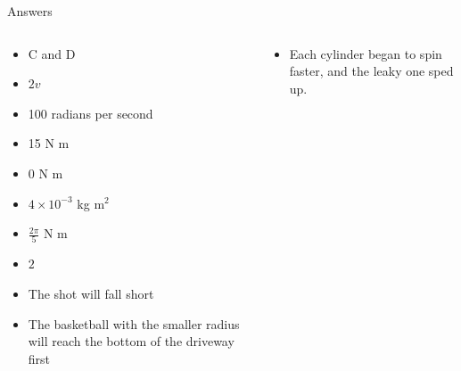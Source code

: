 \documentclass{beamer}
\begin{document}
\begin{frame}{Answers}
\small
\begin{columns}[T]
\begin{column}{0.5\textwidth}
\begin{itemize}
\item C and D
\item $2v$
\item 100 radians per second
\item 15 N m
\item 0 N m
\item $4\times 10^{-3}$ kg m$^2$
\item $\frac{2\pi}{5}$ N m
\item $2$
\item The shot will fall short
\item The basketball with the smaller radius will reach the bottom of the driveway first
\end{itemize}
\end{column}
\begin{column}{0.5\textwidth}
\begin{itemize}
\item Each cylinder began to spin faster, and the leaky one sped up.
\end{itemize}
\end{column}
\end{columns}
\end{frame}
\end{document}

